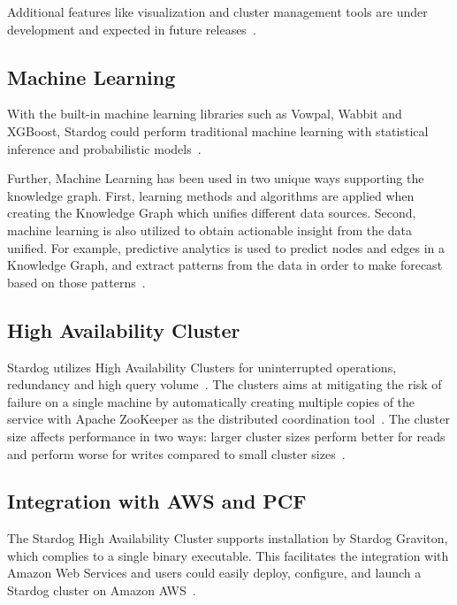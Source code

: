 Additional features like visualization and cluster management tools are under 
development and expected in future 
releases~\cite{hid-sp18-405-www-stardog-studio}.

\subsection{Machine Learning}
With the built-in machine learning libraries such as Vowpal, Wabbit and 
XGBoost, Stardog could perform traditional machine learning with statistical 
inference and probabilistic 
models~\cite{hid-sp18-405-blog-stardog-xgboost}. 

Further, Machine Learning has been used in two unique ways supporting the 
knowledge graph. First, learning methods and algorithms are applied when 
creating  the Knowledge Graph which unifies different data sources. Second,  
machine learning is also utilized to obtain actionable insight from the data 
unified. For example, predictive analytics is used to predict nodes and
edges in a Knowledge Graph, and extract patterns from the data in order to 
make forecast based on those patterns~\cite{hid-sp18-405-blog-stardog-ml}.


\subsection{High Availability Cluster}
Stardog utilizes High Availability Clusters for uninterrupted operations, 
redundancy and high query volume~\cite{hid-sp18-405-www-stardog-docs}. 
The clusters aims at mitigating the risk of failure on a single machine by 
automatically creating multiple copies of the service with Apache ZooKeeper 
as the distributed coordination 
tool~\cite{hid-sp18-405-www-stardog-predictiveanalyticstoday}. The cluster 
size affects performance in two ways: larger cluster sizes perform better 
for reads and perform worse for writes compared to small cluster 
sizes~\cite{hid-sp18-405-www-stardog-docs}. 

\subsection{Integration with AWS and PCF}
The Stardog High Availability Cluster supports installation by Stardog 
Graviton, which complies to a single binary executable. This facilitates the 
integration with Amazon Web Services and users could easily deploy, 
configure, and launch a Stardog cluster on Amazon 
AWS~\cite{hid-sp18-405-blog-stardog-aws}. 

